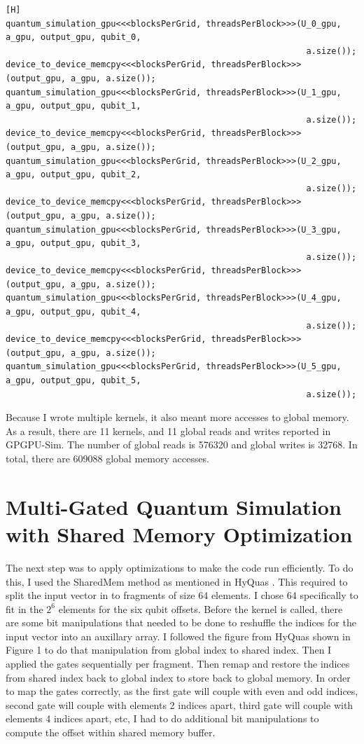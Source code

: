 \documentclass{article}
\begin{document}
\begin{verbatim}[H]
quantum_simulation_gpu<<<blocksPerGrid, threadsPerBlock>>>(U_0_gpu, a_gpu, output_gpu, qubit_0,
                                                            a.size());
device_to_device_memcpy<<<blocksPerGrid, threadsPerBlock>>>(output_gpu, a_gpu, a.size());
quantum_simulation_gpu<<<blocksPerGrid, threadsPerBlock>>>(U_1_gpu, a_gpu, output_gpu, qubit_1,
                                                            a.size());
device_to_device_memcpy<<<blocksPerGrid, threadsPerBlock>>>(output_gpu, a_gpu, a.size());
quantum_simulation_gpu<<<blocksPerGrid, threadsPerBlock>>>(U_2_gpu, a_gpu, output_gpu, qubit_2,
                                                            a.size());
device_to_device_memcpy<<<blocksPerGrid, threadsPerBlock>>>(output_gpu, a_gpu, a.size());
quantum_simulation_gpu<<<blocksPerGrid, threadsPerBlock>>>(U_3_gpu, a_gpu, output_gpu, qubit_3,
                                                            a.size());
device_to_device_memcpy<<<blocksPerGrid, threadsPerBlock>>>(output_gpu, a_gpu, a.size());
quantum_simulation_gpu<<<blocksPerGrid, threadsPerBlock>>>(U_4_gpu, a_gpu, output_gpu, qubit_4,
                                                            a.size());
device_to_device_memcpy<<<blocksPerGrid, threadsPerBlock>>>(output_gpu, a_gpu, a.size());
quantum_simulation_gpu<<<blocksPerGrid, threadsPerBlock>>>(U_5_gpu, a_gpu, output_gpu, qubit_5,
                                                            a.size());
\end{verbatim}

Because I wrote multiple kernels, it also meant more accesses to global memory. As a result, there are 11 kernels, and 11 global reads and writes reported in GPGPU-Sim. The number of global reads is 576320 and global writes is 32768. In total, there are 609088 global memory accesses. 

\section{Multi-Gated Quantum Simulation with Shared Memory Optimization}
The next step was to apply optimizations to make the code run efficiently. To do this, I used the SharedMem method as mentioned in HyQuas \cite{hyquas}. This required to split the input vector in to fragments of size 64 elements. I chose 64 specifically to fit in the $2^6$ elements for the six qubit offsets. Before the kernel is called, there are some bit manipulations that needed to be done to reshuffle the indices for the input vector into an auxillary array. I followed the figure from HyQuas shown in Figure 1 to do that manipulation from global index to shared index. Then I applied the gates sequentially per fragment. Then remap and restore the indices from shared index back to global index to store back to global memory. In order to map the gates correctly, as the first gate will couple with even and odd indices, second gate will couple with elements 2 indices apart, third gate will couple with elements 4 indices apart, etc, I had to do additional bit manipulations to compute the offset within shared memory buffer. 
\end{document}
